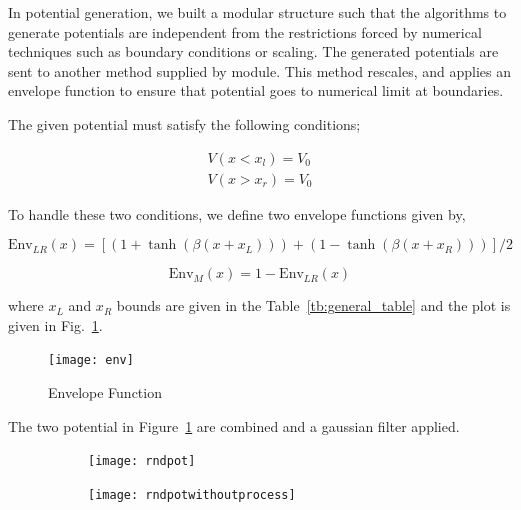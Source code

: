 \documentclass[a4paper,times,hidelinks,12pt]{article}
\begin{document}
In potential generation, we built a modular structure such that the algorithms to generate potentials are independent from the restrictions forced by numerical techniques such as boundary conditions or scaling. The generated potentials are sent to another method supplied by module. This method rescales, and applies an envelope function to ensure that potential goes to numerical limit at boundaries. 

The given potential must satisfy the following conditions;

\begin{equation}
\label{eq:potential_boundary_conditions}
\begin{split}
    V(x < x_l) = V_0 \\ 
    V(x > x_r) = V_0
\end{split}
\end{equation}

To handle these two conditions, we define two envelope functions given by, 

\begin{equation}
\label{eq:envelope_potential_lr}
    \text{Env}_{LR}(x) = [(1 + \tanh{(\beta(x + x_L))}) + (1 - \tanh{(\beta(x + x_R))})]/2
\end{equation}

\begin{equation}
\label{eq:envelope_potential_m}
    \text{Env}_{M}(x) = 1 - \text{Env}_{LR}(x)
\end{equation}

where $x_L$ and $x_R$ bounds are given in the Table~\ref{tb:general_table} and the plot is given in Fig.~\ref{fig:envelope_and_random_withot_pros}.  

\graphicspath{{"../figs/potentials/"}}
\begin{figure}[H]
\centering
\texttt{[image: env]}
\caption{Envelope Function}
\label{fig:envelope_and_random_withot_pros}
\end{figure}

The two potential in Figure~\ref{fig:envelope_and_random_withot_pros} are combined and a gaussian filter applied. 

\graphicspath{{"../figs/numericanalyze/"}}
\begin{figure}[H]
\begin{subfigure}[t]{0.45\textwidth}
    \texttt{[image: rndpot]}
\end{subfigure}
\begin{subfigure}[t]{0.45\textwidth}
    \texttt{[image: rndpotwithoutprocess]}
\end{subfigure}
\end{figure}
\end{document}
